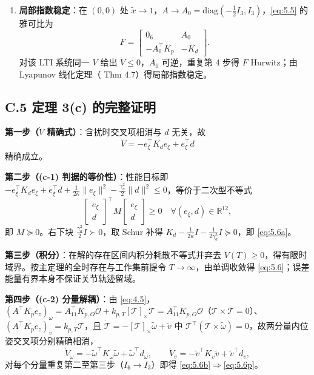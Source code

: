 \begin{enumerate}[leftmargin=2em]
  \item \textbf{局部指数稳定}：在 $(0,0)$ 处 $\tilde x\to1$，$A\to A_0=\mathrm{diag}(-\tfrac12I_3,I_3)$，\eqref{eq:5.5} 的雅可比为
  \begin{equation*}
  F=\begin{bmatrix}0_6 & A_0\\ -A_0^\top K_p & -K_d\end{bmatrix}.
  \end{equation*}
  对该 LTI 系统同一 $V$ 给出 $\dot V\le0$，$A_0$ 可逆，重复第 4 步得 $F$ Hurwitz；由 Lyapunov 线化定理（\cite{Kha02} Thm 4.7）得局部指数稳定。
\end{enumerate}

\subsection*{C.5 定理 3(c) 的完整证明}

\textbf{第一步（$\dot V$ 精确式）}：含扰时交叉项相消与 $d$ 无关，故
\begin{equation*}
\dot V=-e_\xi^\top K_de_\xi+e_\xi^\top d
\end{equation*}
精确成立。

\textbf{第二步（(c-1) 判据的等价性）}：性能目标即 $-e_\xi^\top K_de_\xi+e_\xi^\top d+\tfrac1{2\kappa}\|e_\xi\|^2-\tfrac{\gamma_a^2}2\|d\|^2\le0$，等价于二次型不等式
\begin{equation*}
\begin{bmatrix}e_\xi\\ d\end{bmatrix}^{\!\top}\!M\!
\begin{bmatrix}e_\xi\\ d\end{bmatrix}\ge0\quad\forall(e_\xi,d)\in\mathbb R^{12},
\end{equation*}
即 $M\succeq0$。右下块 $\tfrac{\gamma_a^2}2I\succ0$，取 Schur 补得 $K_d-\tfrac1{2\kappa}I-\tfrac1{2\gamma_a^2}I\succeq0$，即 \eqref{eq:5.6a}。

\textbf{第三步（积分）}：在解的存在区间内积分耗散不等式并弃去 $V(T)\ge0$，得有限时域界。按主定理的全时存在与工作集前提令 $T\to\infty$，由单调收敛得 \eqref{eq:5.6}；误差能量有界本身不保证关节轨迹留域。

\textbf{第四步（(c-2) 分量解耦）}：由 \eqref{eq:4.5}，$(A^\top K_pe_z)_\omega=A_{11}^\top K_{p,O}\mathcal O+k_{p,T}[\mathcal T]_\times\mathcal T=A_{11}^\top K_{p,O}\mathcal O$（$\mathcal T\times\mathcal T=0$）、$(A^\top K_pe_z)_v=k_{p,T}\mathcal T$，且 $\dot{\mathcal T}=-[\mathcal T]_\times\tilde\omega+\tilde v$ 中 $\mathcal T^\top(\mathcal T\times\tilde\omega)=0$，故两分量内位姿交叉项分别精确相消，
\begin{equation*}
\dot V_\omega=-\tilde\omega^\top K_\omega\tilde\omega+\tilde\omega^\top d_\omega,
\qquad
\dot V_v=-\tilde v^\top K_v\tilde v+\tilde v^\top d_v ,
\end{equation*}
对每个分量重复第二至第三步（$I_6\to I_3$）即得 \eqref{eq:5.6b}$\Rightarrow$\eqref{eq:5.6p}。

